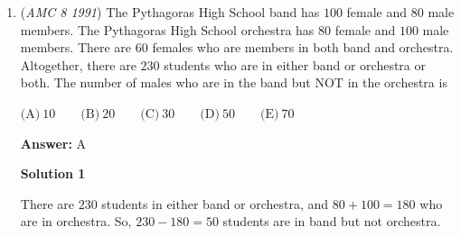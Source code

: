 \begin{enumerate}
 \textbf{Answer: }D



\textbf{Solution 1 (Complementary Counting)}

The probability that the product is even can be found by subtracting the probability that the product is odd from $1$.  This approach is known as complementary counting.

 The product of two numbers is odd if and only if both numbers are odd.  The probability the left spinner lands on an odd number is $\frac{2}{3}$, while the probability the right spinner lands on an odd number is $\frac{1}{3}$.  So, the probability that the product is odd is $\frac{1}{3}\cdot\frac{2}{3} = \frac{2}{9}$, while the probability that the product is even is $1 -\frac{2}{9} = \boxed{\textbf{(D)}\ \frac{7}{9}}$.

 



\textbf{Solution 2 (Inclusion-Exclusion)}

The product of two numbers is even if and only if at least one number is even.  The probability the left spinner lands on an even number is $\frac{1}{3}$. The probability that the right spinner lands on an even number is $\frac{2}{3}$.  The probability that both spinners land on even numbers is $\frac{1}{3} \cdot \frac{2}{3} = \frac{2}{9}$.  By the principle of inclusion-exclusion, the probability that the product is even is $\frac{1}{3} + \frac{2}{3} - \frac{2}{9} = \boxed{\textbf{(D)}\ \frac{7}{9}}$.

 


	\item (\textit{AMC 8 1991}) The Pythagoras High School band has $100$ female and $80$ male members.  The Pythagoras High School orchestra has $80$ female and $100$ male members.  There are $60$ females who are members in both band and orchestra.  Altogether, there are $230$ students who are in either band or orchestra or both.  The number of males who are in the band but NOT in the orchestra is


 $\text{(A)}\ 10 \qquad \text{(B)}\ 20 \qquad \text{(C)}\ 30 \qquad \text{(D)}\ 50 \qquad \text{(E)}\ 70$

 \textbf{Answer: }A



\textbf{Solution 1}

There are $230$ students in either band or orchestra, and $80+100=180$ who are in orchestra.  So, $230-180=50$ students are in band but not orchestra.


\end{enumerate}
